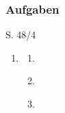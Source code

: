 
\subsubsection{Aufgaben}

\begin{Exercise}{S. 48/4}{}
\begin{enumerate}[leftmargin=*]
    \item [4.]\begin{enumerate}[label=\alph*),leftmargin=*]
        \item [a)] {
            }
        \item [b)] {
            }
        \item [c)] {
            }
    \end{enumerate}
\end{enumerate}
\end{Exercise}

